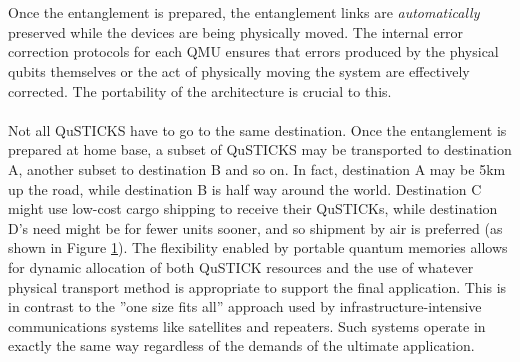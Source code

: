 \documentclass[aps,prl,twocolumn,10pt,nofootinbib]{revtex4}
\begin{document}
\\
\\
Once the entanglement is prepared, the entanglement links are {\em automatically} preserved while the devices are being physically moved.  The internal error correction protocols for each QMU ensures that errors produced by the physical qubits themselves or the act of physically moving the system are effectively corrected.  The portability of the architecture is crucial to this. 
\\
\\
Not all QuSTICKS have to go to the same destination.  Once the entanglement is prepared at home base, a subset of QuSTICKS may be transported to destination A, another subset to destination B and so on.  In fact, destination A may be 5km up the road, while destination B is half way around the world.  Destination C might use low-cost cargo shipping to receive their QuSTICKs, while destination D's need might be for fewer units sooner, and so shipment by air is preferred (as shown in Figure \ref{fig:distribution}).  The flexibility enabled by portable quantum memories allows for dynamic allocation of both QuSTICK resources and the use of whatever physical transport method is appropriate to support the final application.  This is in contrast to the ''one size fits all'' approach used by  infrastructure-intensive communications systems like satellites and repeaters.  Such systems operate in exactly the same way regardless of the demands of the ultimate application.
\begin{figure}[ht!]
	\caption{}
	\label{fig:distribution}
\end{figure}
\end{document}
